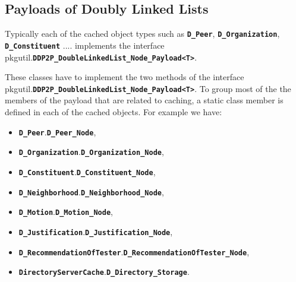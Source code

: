 \documentclass{book}
\newcommand{\cls}[1]{{\tt\bf #1}}
\begin{document}
\subsection{Payloads of Doubly Linked Lists}

Typically each of the cached object types such as \cls{D\_Peer}, \cls{D\_Organization}, \cls{D\_Constituent} .... 
implements the interface pkg{util}.\cls{DDP2P\_DoubleLinkedList\_Node\_Payload<T>}.

These classes have to implement the two methods of the interface pkg{util}.\cls{DDP2P\_DoubleLinkedList\_Node\_Payload<T>}.
To group most of the the members of the payload that are related to caching, a static class member is defined in
each of the cached objects. For example we have: 
\begin{itemize}
\item
\cls{D\_Peer}.\cls{D\_Peer\_Node}, 
\item
\cls{D\_Organization}.\cls{D\_Organization\_Node},
\item
\cls{D\_Constituent}.\cls{D\_Constituent\_Node}, 
\item
\cls{D\_Neighborhood}.\cls{D\_Neighborhood\_Node}, 
\item
\cls{D\_Motion}.\cls{D\_Motion\_Node}, 
\item
\cls{D\_Justification}.\cls{D\_Justification\_Node}, 
\item
\cls{D\_RecommendationOfTester}.\cls{D\_RecommendationOfTester\_Node}, 
\item
\cls{DirectoryServerCache}.\cls{D\_Directory\_Storage}.
\end{itemize}
\end{document}
